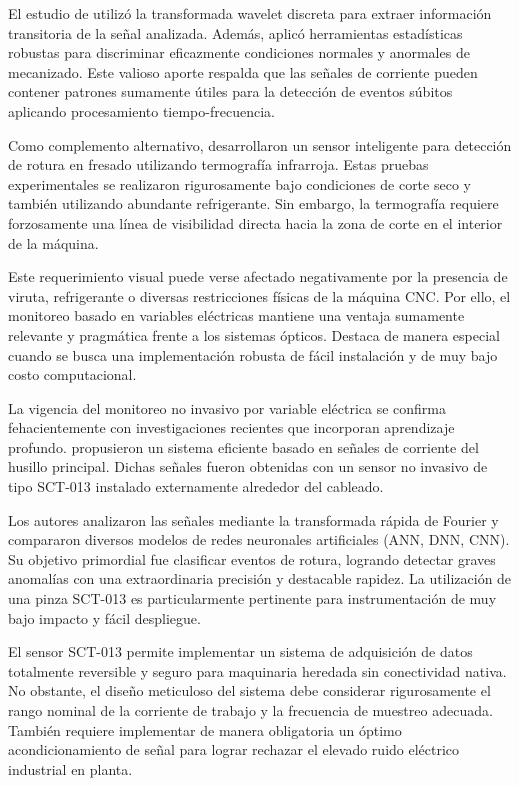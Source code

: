 El estudio de \cite{sevilla2011} utilizó la transformada wavelet discreta para extraer información transitoria de la señal analizada. Además, aplicó herramientas estadísticas robustas para discriminar eficazmente condiciones normales y anormales de mecanizado. Este valioso aporte respalda que las señales de corriente pueden contener patrones sumamente útiles para la detección de eventos súbitos aplicando procesamiento tiempo-frecuencia.

Como complemento alternativo, \cite{ramirez2018} desarrollaron un sensor inteligente para detección de rotura en fresado utilizando termografía infrarroja. Estas pruebas experimentales se realizaron rigurosamente bajo condiciones de corte seco y también utilizando abundante refrigerante. Sin embargo, la termografía requiere forzosamente una línea de visibilidad directa hacia la zona de corte en el interior de la máquina.

Este requerimiento visual puede verse afectado negativamente por la presencia de viruta, refrigerante o diversas restricciones físicas de la máquina CNC. Por ello, el monitoreo basado en variables eléctricas mantiene una ventaja sumamente relevante y pragmática frente a los sistemas ópticos. Destaca de manera especial cuando se busca una implementación robusta de fácil instalación y de muy bajo costo computacional.

La vigencia del monitoreo no invasivo por variable eléctrica se confirma fehacientemente con investigaciones recientes que incorporan aprendizaje profundo. \cite{lai2025} propusieron un sistema eficiente basado en señales de corriente del husillo principal. Dichas señales fueron obtenidas con un sensor no invasivo de tipo SCT-013 instalado externamente alrededor del cableado.

Los autores analizaron las señales mediante la transformada rápida de Fourier y compararon diversos modelos de redes neuronales artificiales (ANN, DNN, CNN). Su objetivo primordial fue clasificar eventos de rotura, logrando detectar graves anomalías con una extraordinaria precisión y destacable rapidez. La utilización de una pinza SCT-013 es particularmente pertinente para instrumentación de muy bajo impacto y fácil despliegue.

El sensor SCT-013 permite implementar un sistema de adquisición de datos totalmente reversible y seguro para maquinaria heredada sin conectividad nativa. No obstante, el diseño meticuloso del sistema debe considerar rigurosamente el rango nominal de la corriente de trabajo y la frecuencia de muestreo adecuada. También requiere implementar de manera obligatoria un óptimo acondicionamiento de señal para lograr rechazar el elevado ruido eléctrico industrial en planta.

